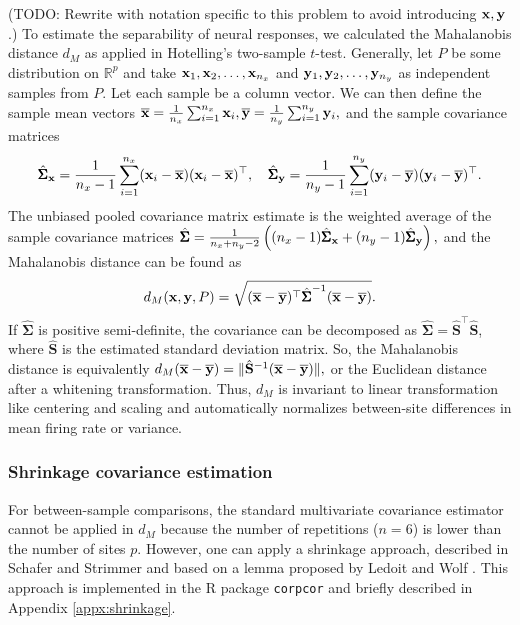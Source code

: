 \documentclass[draft]{cmustatproposal} %
\newcommand{\todo}[1]{{\color{purple}#1}}
\begin{document}
\todo{(TODO: Rewrite with notation specific to this problem to avoid introducing \( \mathbf{x}, \mathbf{y} \).)}
To estimate the separability of neural responses, we calculated the Mahalanobis distance \( d_M \) as applied in Hotelling's two-sample \( t \)-test.  
Generally, let \( P \) be some distribution on \( \mathbb{R}^p \) and take \( \mathbf{x}_1, \mathbf{x}_2, \dots, \mathbf{x}_{n_x} \) and \( \mathbf{y}_1, \mathbf{y}_2, \dots, \mathbf{y}_{n_y} \) as independent samples from \( P \). Let each sample be a column vector. We can then define the sample mean vectors
\( \overline{\mathbf{x}} = \frac{1}{n_x} \sum_{i = 1}^{n_x} \mathbf{x}_i,
\overline{\mathbf{y}} = \frac{1}{n_y} \sum_{i = 1}^{n_y} \mathbf{y}_i, \)
and the sample covariance matrices
\[ 
\hat{\pmb\Sigma}_{\mathbf{x}} = \frac{1}{n_x - 1} \sum_{i = 1}^{n_x} (\mathbf{x}_i - \overline{\mathbf{x}}) (\mathbf{x}_i - \overline{\mathbf{x}})^\top, \quad
\hat{\pmb\Sigma}_{\mathbf{y}} = \frac{1}{n_y - 1} \sum_{i = 1}^{n_y} (\mathbf{y}_i - \overline{\mathbf{y}}) (\mathbf{y}_i - \overline{\mathbf{y}})^\top. 
\]
The unbiased pooled covariance matrix estimate is the weighted average of the sample covariance matrices 
\( \hat{\pmb\Sigma} = \frac{1}{n_x + n_y - 2} \left( 
(n_x - 1) \hat{\pmb\Sigma}_{\mathbf{x}} + (n_y - 1) \hat{\pmb\Sigma}_{\mathbf{y}} \right), \)
and the Mahalanobis distance can be found as
\begin{equation}
d_M (\mathbf{x}, \mathbf{y}, P) = 
\sqrt{ (\overline{\mathbf{x}} - \overline{\mathbf{y}})^\top \hat{\pmb\Sigma}^{-1} (\overline{\mathbf{x}} - \overline{\mathbf{y}}) }.
\end{equation}
If \( \hat{\pmb\Sigma} \) is positive semi-definite, the covariance can be decomposed as \( \hat{\pmb\Sigma} = \hat{\mathbf{S}}^\top \hat{\mathbf{S}} \), where \( \hat{\mathbf{S}} \) is the estimated standard deviation matrix. So, the Mahalanobis distance is equivalently 
\( d_M (\overline{\mathbf{x}} - \overline{\mathbf{y}}) = \| \hat{\mathbf{S}}^{-1} (\overline{\mathbf{x}} - \overline{\mathbf{y}}) \|, \)
or the Euclidean distance after a whitening transformation. Thus, \( d_M \) is invariant to linear transformation like centering and scaling and automatically normalizes between-site differences in mean firing rate or variance. 

\subsubsection{Shrinkage covariance estimation}

For between-sample comparisons, the standard multivariate covariance estimator cannot be applied in \( d_M \) because the number of repetitions (\( n = 6 \)) is lower than the number of sites \( p \). However, one can apply a shrinkage approach, described in Schafer and Strimmer \cite{schafer_shrinkage_2005} and based on a lemma proposed by Ledoit and Wolf  \cite{ledoit_improved_2003}. This approach is implemented in the R package \texttt{corpcor} \cite{schafer_corpcor_2021} and briefly described in Appendix \ref{appx:shrinkage}.
\end{document}
